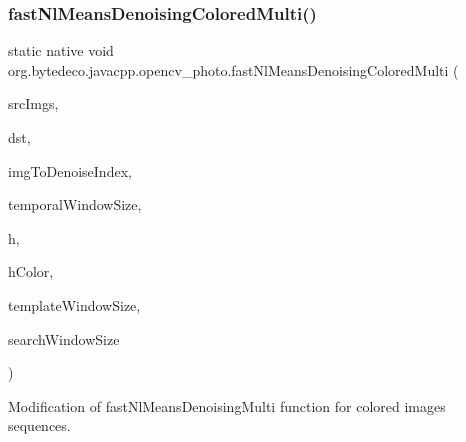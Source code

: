 \subsubsection{\texorpdfstring{fast\+Nl\+Means\+Denoising\+Colored\+Multi()}{fastNlMeansDenoisingColoredMulti()}}
{\footnotesize\ttfamily static native void org.\+bytedeco.\+javacpp.\+opencv\+\_\+photo.\+fast\+Nl\+Means\+Denoising\+Colored\+Multi (\begin{DoxyParamCaption}\item[{@By\+Val Mat\+Vector}]{src\+Imgs,  }\item[{@By\+Val Mat}]{dst,  }\item[{int}]{img\+To\+Denoise\+Index,  }\item[{int}]{temporal\+Window\+Size,  }\item[{float}]{h,  }\item[{float}]{h\+Color,  }\item[{int}]{template\+Window\+Size,  }\item[{int}]{search\+Window\+Size }\end{DoxyParamCaption})\hspace{0.3cm}{\ttfamily [static]}}



Modification of fast\+Nl\+Means\+Denoising\+Multi function for colored images sequences. 


